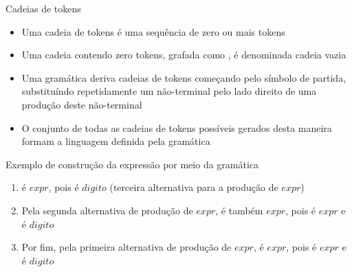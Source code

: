 \begin{frame}[fragile]{Cadeias de tokens}

    \begin{itemize}
        \item Uma cadeia de tokens é uma sequência de zero ou mais tokens
        \pause

        \item Uma cadeia contendo zero tokens, grafada como , é denominada cadeia vazia
        \pause

        \item Uma gramática deriva cadeias de tokens começando pelo símbolo de partida, substituíndo repetidamente um não-terminal pelo lado direito de uma
            produção deste não-terminal
        \pause

        \item O conjunto de todas as cadeias de tokens possíveis gerados desta maneira formam a linguagem definida pela gramática
    \end{itemize}

\end{frame}

\begin{frame}[fragile]{Exemplo de construção da expressão  por meio da gramática}

    \begin{enumerate}
        \item {} é $expr$, pois  é $digito$ (terceira alternativa para a produção de $expr$)
        \pause

        \item Pela segunda alternativa de produção de $expr$,   é também $expr$, pois  é $expr$ e  é $digito$
        \pause

        \item Por fim, pela primeira alternativa de produção de $expr$,  é $expr$, pois  é $expr$ e  é $digito$
    \end{enumerate}

\end{frame}

